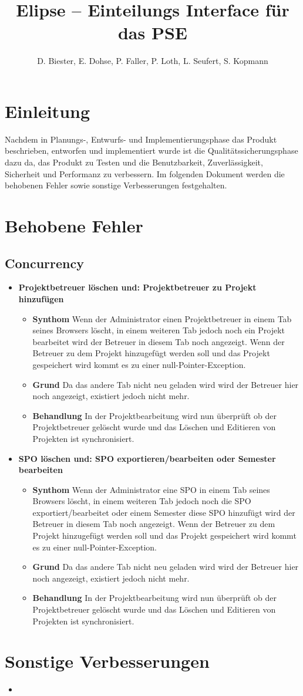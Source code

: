\documentclass[parskip=full]{scrartcl}
\newcommand{\fehler}[4]{\textbf{#1}
 							\begin{itemize}
 							  \item \textbf{Synthom}  #2
 							  \item \textbf{Grund} #3
 							  \item \textbf{Behandlung} #4
 							\end{itemize}}
\newcommand{\code}[1]{{\ttfamily #1}}
\begin{document}
\title{Elipse -- Einteilungs Interface für das PSE}
\author{D. Biester, E. Dohse, P. Faller, P. Loth, L. Seufert, S. Kopmann}
\zweitgutachter{}
\mytitlepage
{\setlength{\textheight}{297mm}
\tableofcontents

\setlength{\textheight}{297mm}}
\pagebreak

\section{Einleitung}
Nachdem in Planungs-, Entwurfs- und Implementierungsphase das Produkt
beschrieben, entworfen und implementiert wurde ist die Qualitätssicherungsphase
dazu da, das Produkt zu Testen und die Benutzbarkeit, Zuverlässigkeit, 
Sicherheit und Performanz zu verbessern. Im folgenden Dokument werden die
behobenen Fehler sowie sonstige Verbesserungen festgehalten.

\section{Behobene Fehler}
\subsection{Concurrency}
\begin{itemize}
  \item \fehler{Projektbetreuer löschen und: Projektbetreuer zu Projekt
  hinzufügen}{Wenn der Administrator einen Projektbetreuer in einem Tab seines Browsers löscht, in einem weiteren
  Tab jedoch noch ein Projekt bearbeitet wird der Betreuer in diesem Tab
  noch angezeigt. Wenn der Betreuer zu dem Projekt hinzugefügt werden soll und
  das Projekt gespeichert wird kommt es zu einer
  \code{null}-Pointer-Exception.}{Da das andere Tab nicht neu geladen wird wird
  der Betreuer hier noch angezeigt, existiert jedoch nicht mehr. }{In der
  Projektbearbeitung wird nun überprüft ob der Projektbetreuer gelöscht wurde
  und das Löschen und Editieren von Projekten ist synchronisiert. }
    \item \fehler{SPO löschen und: SPO exportieren/bearbeiten oder Semester
    bearbeiten }{Wenn der Administrator eine SPO in einem Tab
    seines Browsers löscht, in einem weiteren Tab jedoch noch die SPO
    exportiert/bearbeitet oder einem Semester diese SPO hinzufügt wird der
    Betreuer in diesem Tab noch angezeigt.
    Wenn der Betreuer zu dem Projekt hinzugefügt werden soll und das Projekt gespeichert wird kommt es zu einer
  \code{null}-Pointer-Exception.}{Da das andere Tab nicht neu geladen wird wird
  der Betreuer hier noch angezeigt, existiert jedoch nicht mehr. }{In der
  Projektbearbeitung wird nun überprüft ob der Projektbetreuer gelöscht wurde
  und das Löschen und Editieren von Projekten ist synchronisiert. }
\end{itemize}


\section{Sonstige Verbesserungen}

\begin{itemize}
\item
\end{itemize}
\end{document}
